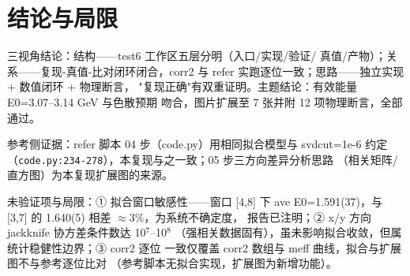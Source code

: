 \documentclass[UTF8]{ctexart}
\begin{document}
\section{结论与局限}
\begin{conclbox}
三视角结论：\textcolor{struct}{结构}——test6 工作区五层分明（入口/实现/验证/
真值/产物）；\textcolor{relation}{关系}——复现-真值-比对闭环闭合，corr2 与
refer 实跑逐位一致；\textcolor{idea}{思路}——独立实现 + 数值闭环 + 物理断言，
"复现正确"有双重证明。主题结论：有效能量 E0=3.07--3.14 GeV 与色散预期
吻合，图片扩展至 7 张并附 12 项物理断言，全部通过。
\end{conclbox}
\begin{refbox}
参考侧证据：refer 脚本 04 步（code.py）用相同拟合模型与 svdcut=1e-6 约定
（\texttt{code.py:234-278}），本复现与之一致；05 步三方向差异分析思路
（相关矩阵/直方图）为本复现扩展图的来源。
\end{refbox}
\begin{warnbox}
\textcolor{warn}{未验证}项与局限：① 拟合窗口敏感性——窗口 [4,8] 下
ave E0=1.591(37)，与 [3,7] 的 1.640(5) 相差 $\approx$3\%，为系统不确定度，
报告已注明；② x/y 方向 jackknife 协方差条件数达 10$^{7}$--10$^{8}$
（强相关数据固有），虽未影响拟合收敛，但属统计稳健性边界；③ corr2 逐位
一致仅覆盖 corr2 数组与 meff 曲线，拟合与扩展图不与参考逐位比对
（参考脚本无拟合实现，扩展图为新增功能）。
\end{warnbox}
\end{document}
